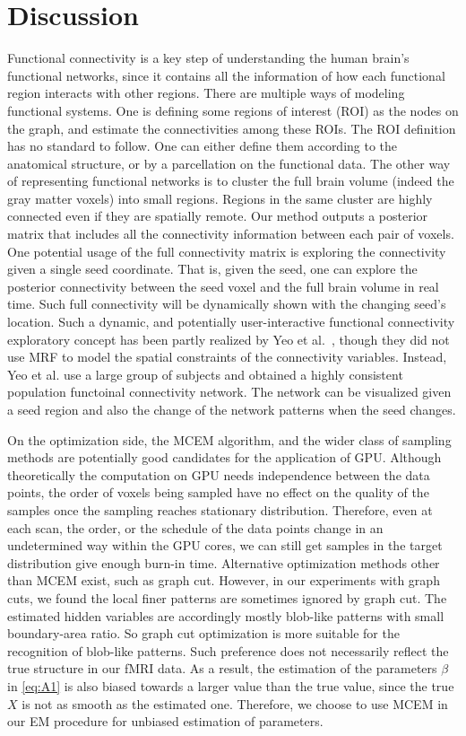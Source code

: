 \section{Discussion}
Functional connectivity is a key step of understanding the human brain's
functional networks, since it contains all the information of how each
functional region interacts with other regions. There are multiple ways of
modeling functional systems. One is defining some regions of interest (ROI) as
the nodes on the graph, and estimate the connectivities among these ROIs. The
ROI definition has no standard to follow. One can either define them according
to the anatomical structure, or by a parcellation on the functional data. The
other way of representing functional networks is to cluster the full brain
volume (indeed the gray matter voxels) into small regions. Regions in the same
cluster are highly connected even if they are spatially remote. Our method
outputs a posterior matrix that includes all the connectivity information between
each pair of voxels. One potential usage of the full connectivity matrix is 
exploring the connectivity given a single seed coordinate. That is, given the
seed, one can explore the posterior connectivity between the seed voxel and the
full brain volume in real time. Such full connectivity will be dynamically
shown with the changing seed's location. Such a dynamic, and potentially
user-interactive functional connectivity exploratory concept has been partly
realized by Yeo et al.~\cite{yeo2011organization}, though they did not use MRF
to model the spatial constraints of the connectivity variables. Instead, Yeo
et al. use
a large group of subjects and obtained a highly consistent population functoinal
connectivity network. The network can be visualized given a seed region and also
the change of the network patterns when the seed changes.

On the optimization side, the MCEM algorithm, and the wider class of sampling
methods are potentially good candidates for the application of GPU. Although
theoretically the computation on GPU needs independence between the data
points, the order of voxels being sampled have no effect on the quality of the
samples once the sampling reaches stationary distribution. Therefore, even at
each scan, the order, or the schedule of the data points change in an
undetermined way within the GPU cores, we can still get samples in the target
distribution give enough burn-in time. Alternative optimization methods other
than MCEM exist, such as graph cut. However, in our experiments with graph
cuts, we found the local finer patterns are sometimes ignored by graph
cut. The estimated hidden variables are accordingly mostly blob-like patterns
with small boundary-area ratio. So graph cut optimization is more suitable for
the recognition of blob-like patterns. Such preference does not necessarily
reflect the true structure in our fMRI data. As a result, the estimation of
the parameters $\beta$ in \eqref{eq:A1} is also biased towards a larger value
than the true value, since the true $X$ is not as smooth as the estimated
one. Therefore, we choose to use MCEM in our EM procedure for unbiased
estimation of parameters.

